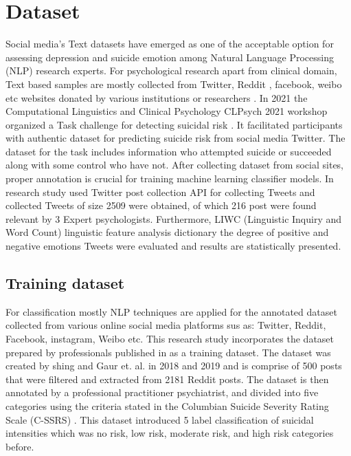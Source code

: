 \documentclass[sn-mathphys,Numbered]{sn-jnl}%
\theoremstyle{thmstyleone}%
\theoremstyle{thmstyletwo}%
\theoremstyle{thmstylethree}%
\begin{document}
\section{Dataset}
\label{dtset}
Social media's Text datasets have emerged as one of the acceptable option for assessing depression and suicide emotion among Natural Language Processing (NLP) research experts. For psychological research apart from clinical domain, Text based samples are mostly collected from Twitter, Reddit \cite{tadesse2019detection}, facebook, weibo etc websites donated by various institutions or researchers \cite{rissola2020dataset}. In 2021 the Computational Linguistics and Clinical Psychology CLPsych 2021 workshop organized a Task challenge for detecting suicidal risk \cite{macavaney2021community}. It facilitated participants with authentic dataset for predicting suicide risk from social media Twitter. The dataset for the task includes information who attempted suicide or succeeded along with some control who have not. After collecting dataset from social sites, proper annotation is crucial for training machine learning classifier models. In\cite{lopez2022exploring} research study used Twitter post collection API for collecting Tweets and collected Tweets of size 2509 were obtained, of which 216 post were found relevant by 3 Expert psychologists. Furthermore, LIWC (Linguistic Inquiry and Word Count) \cite{pennebaker2001linguistic} linguistic feature analysis dictionary the degree of positive and negative emotions Tweets were evaluated and results are statistically presented. 

\subsection{Training dataset}
For classification mostly NLP techniques are applied for the annotated dataset collected from various online social media platforms sus as: Twitter, Reddit, Facebook, instagram, Weibo \cite{wang2020depression, malhotra2022deep} etc. This research study incorporates the dataset prepared by professionals published in \cite{gaur2019knowledge} as a training dataset. The dataset was created by shing and Gaur et. al. in 2018 \cite{shing2018expert} and 2019 \cite{gaur2019knowledge} and is comprise of 500 posts that were filtered and extracted from 2181 Reddit posts. The dataset is then annotated by a professional practitioner psychiatrist, and divided into five categories using the criteria stated in the Columbian Suicide Severity Rating Scale (C-SSRS) \cite{gaur2019knowledge}. This dataset introduced 5 label classification of suicidal intensities which was no risk, low risk, moderate risk, and high risk categories before. 
\end{document}
